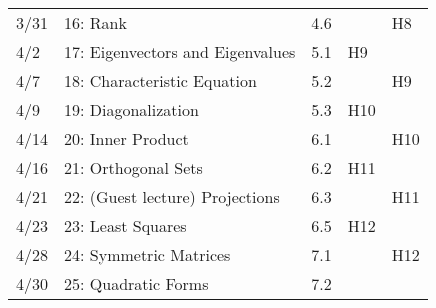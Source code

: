 \documentclass[11pt]{article}
\begin{document}
\begin{centering}
\begin{tabular}{||l|p{3in}|l|l|l||}
3/31 & 16: Rank & 4.6 &  & H8\\
4/2 & 17: Eigenvectors and Eigenvalues & 5.1 & H9 &\\
\hline

4/7 & 18: Characteristic Equation & 5.2 & & H9\\
4/9 & 19: Diagonalization & 5.3 & H10 &\\
\hline

4/14 & 20: Inner Product & 6.1 & & H10\\
4/16 & 21: Orthogonal Sets & 6.2 & H11 &\\
 \hline

4/21 & 22: (Guest lecture) Projections & 6.3 & & H11\\
4/23 & 23: Least Squares & 6.5 & H12 & \\
\hline

4/28 & 24: Symmetric Matrices & 7.1 & & H12\\
4/30 & 25: Quadratic Forms & 7.2 &  &\\
\hline\hline

\end{tabular}\\
\end{centering}
\end{document}
